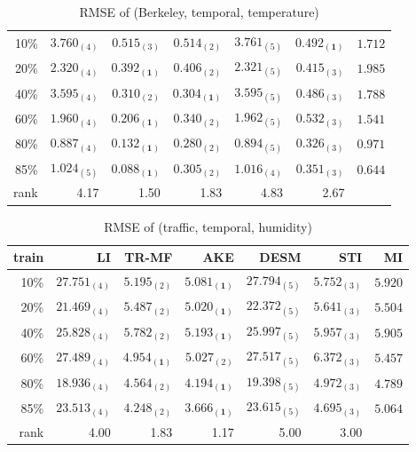 \begin{table}[htbp]
\setlength{\tabcolsep}{2pt}
\centering
\caption{RMSE of (Berkeley, temporal, temperature)}
\label{table:berkeley_temporal_tem}
\begin{tabular}{ r | r r r r r r}
    10\% & $ 3.760_{(4)} $ & $ 0.515_{(3)} $ & $ 0.514_{(2)} $ & $3.761_{(5)}$ & $\mathbf{ 0.492_{(1)}}$ &$1.712$\\
    20\% & $ 2.320_{(4)} $ & $ \mathbf{ 0.392_{(1)} } $ & $ 0.406_{(2)} $ & $ 2.321_{(5)} $ & $ 0.415_{(3)} $ &$1.985$\\
    40\% & $ 3.595_{(4)} $ & $ 0.310_{(2)} $ & $ \mathbf{ 0.304_{(1)} } $ & $ 3.595_{(5)} $ & $ 0.486_{(3)} $ &$1.788$\\
    60\% & $ 1.960_{(4)} $ & $ \mathbf{ 0.206_{(1)} } $ & $ 0.340_{(2)} $ & $ 1.962_{(5)} $ & $ 0.532_{(3)} $ &$1.541$\\
    80\% & $ 0.887_{(4)} $ & $ \mathbf{ 0.132_{(1)} } $ & $ 0.280_{(2)} $ & $ 0.894_{(5)} $ & $ 0.326_{(3)} $ &$0.971$\\
    85\% & $ 1.024_{(5)} $ & $ \mathbf{ 0.088_{(1)} } $ & $ 0.305_{(2)} $ & $ 1.016_{(4)} $ & $ 0.351_{(3)} $ &$0.644$\\ \hline
rank &4.17 &1.50 &1.83 &4.83 &2.67 \\
\end{tabular}
\end{table}





\begin{table} [htbp]
\setlength{\tabcolsep}{2pt}
\centering
\caption{RMSE of (traffic, temporal, humidity)}
\label{table:traffic_temporal_hum}
\begin{tabular}{ r | r r r r r r}
	train	&LI	&TR-MF	&AKE	&DESM	&STI &MI\\ \hline
	10\% & $ 27.751_{(4)} $ & $ 5.195_{(2)} $ & $ \mathbf{ 5.081_{(1)} } $ & $ 27.794_{(5)} $ & $ 5.752_{(3)} $ &$5.920$\\
	20\% & $ 21.469_{(4)} $ & $ 5.487_{(2)} $ & $ \mathbf{ 5.020_{(1)} } $ & $ 22.372_{(5)} $ & $ 5.641_{(3)} $ &$5.504$\\
	40\% & $ 25.828_{(4)} $ & $ 5.782_{(2)} $ & $ \mathbf{ 5.193_{(1)} } $ & $ 25.997_{(5)} $ & $ 5.957_{(3)} $ &$5.905$\\
	60\% & $ 27.489_{(4)} $ & $ \mathbf{ 4.954_{(1)} } $ & $ 5.027_{(2)} $ & $ 27.517_{(5)} $ & $ 6.372_{(3)} $ &$5.457$\\
	80\% & $ 18.936_{(4)} $ & $ 4.564_{(2)} $ & $ \mathbf{ 4.194_{(1)} } $ & $ 19.398_{(5)} $ & $ 4.972_{(3)} $ &$4.789$\\
	85\% & $ 23.513_{(4)} $ & $ 4.248_{(2)} $ & $ \mathbf{ 3.666_{(1)} } $ & $ 23.615_{(5)} $ & $ 4.695_{(3)} $ &$5.064$\\ \hline
	rank &4.00 &1.83 &1.17 &5.00 &3.00 \\
\end{tabular}
\end{table}


